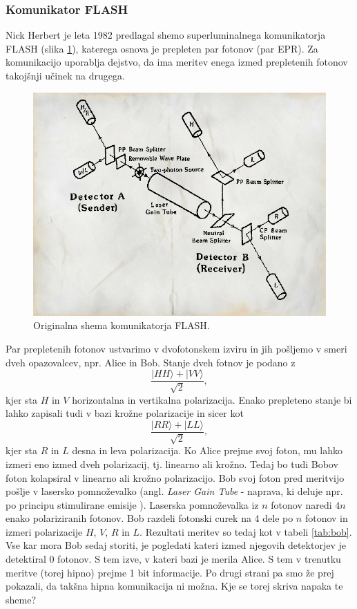 \documentclass[12pt]{article}
\begin{document}
\subsubsection{Komunikator FLASH}

\par Nick Herbert je leta 1982 predlagal shemo superluminalnega komunikatorja FLASH (slika \ref{fig:flash}), katerega osnova je prepleten par fotonov (par EPR). Za komunikacijo uporablja dejstvo, da ima meritev enega izmed prepletenih fotonov takojšnji učinek na drugega.

\begin{figure}[h]
\includegraphics[width=12cm]{flash.jpg}
\centering
\caption{Originalna shema komunikatorja FLASH. \cite{herbertFLASHSuperluminalCommunicator1982}}
\label{fig:flash}
\end{figure}
\par Par prepletenih fotonov ustvarimo v dvofotonskem izviru in jih pošljemo v smeri dveh opazovalcev, npr. Alice in Bob. Stanje dveh fotnov je podano z
\begin{equation}
\frac{| HH \rangle + | VV \rangle}{\sqrt{2}},
\end{equation}
kjer sta $H$ in $V$ horizontalna in vertikalna polarizacija. Enako prepleteno stanje bi lahko zapisali tudi v bazi krožne polarizacije in sicer kot
\begin{equation}
\frac{| RR \rangle + | LL \rangle}{\sqrt{2}},
\end{equation}
kjer sta $R$ in $L$ desna in leva polarizacija. Ko Alice prejme svoj foton, mu lahko izmeri eno izmed dveh polarizacij, tj. linearno ali krožno. Tedaj bo tudi Bobov foton kolapsiral v linearno ali krožno polarizacijo. Bob svoj foton pred meritvijo pošlje v lasersko pomnoževalko (angl. \emph{Laser Gain Tube} - naprava, ki deluje npr. po principu stimulirane emisije \cite{woottersSingleQuantumCannot1982}). Laserska pomnoževalka iz $n$ fotonov naredi $4n$ enako polariziranih fotonov. Bob razdeli fotonski curek na 4 dele po $n$ fotonov in izmeri polarizacije $H$, $V$, $R$ in $L$. Rezultati meritev so tedaj kot v tabeli \ref{tab:bob}. Vse kar mora Bob sedaj storiti, je pogledati kateri izmed njegovih detektorjev je detektiral 0 fotonov. S tem izve, v kateri bazi je merila Alice. S tem v trenutku meritve (torej hipno) prejme 1 bit informacije. Po drugi strani pa smo že prej pokazali, da takšna hipna komunikacija ni možna. Kje se torej skriva napaka te sheme? \cite{marcocerezoEntangledParticlesFaster2015}
\end{document}

